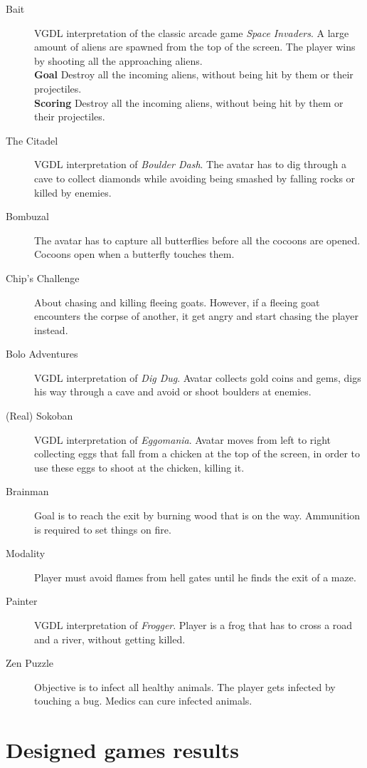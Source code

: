 \documentclass[a4paper,titlepage,final]{report}
\begin{document}
\begin{appendices}
\begin{description}
\item [Bait] VGDL interpretation of the classic arcade game \emph{Space Invaders}. A large amount of aliens are spawned from the top of the screen. The player wins by shooting all the approaching aliens.\\
\textbf{Goal} Destroy all the incoming aliens, without being hit by them or their projectiles.\\
\textbf{Scoring} Destroy all the incoming aliens, without being hit by them or their projectiles.
\item [The Citadel] VGDL interpretation of \emph{Boulder Dash}. The avatar has to dig through a cave to collect diamonds while avoiding being smashed by falling rocks or killed by enemies. 
\item [Bombuzal] The avatar has to capture all butterflies before all the cocoons are opened. Cocoons open when a butterfly touches them.
\item [Chip's Challenge] About chasing and killing fleeing goats. However, if a fleeing goat encounters the corpse of another, it get angry and start chasing the player instead.
\item [Bolo Adventures] VGDL interpretation of \emph{Dig Dug}. Avatar collects gold coins and gems, digs his way through a cave and avoid or shoot boulders at enemies.
\item [(Real) Sokoban] VGDL interpretation of \emph{Eggomania}. Avatar moves from left to right collecting eggs that fall from a chicken at the top of the screen, in order to use these eggs to shoot at the chicken, killing it.
\item [Brainman] Goal is to reach the exit by burning wood that is on the way. Ammunition is required to set things on fire.
\item [Modality] Player must avoid flames from hell gates until he finds the exit of a maze.
\item [Painter] VGDL interpretation of \emph{Frogger}. Player is a frog that has to cross a road and a river, without getting killed.
\item [Zen Puzzle] Objective is to infect all healthy animals. The player gets infected by touching a bug. Medics can cure infected animals.
\end{description}



\chapter{Designed games results}
\label{app_designedresults}


\end{appendices}
\end{document}
